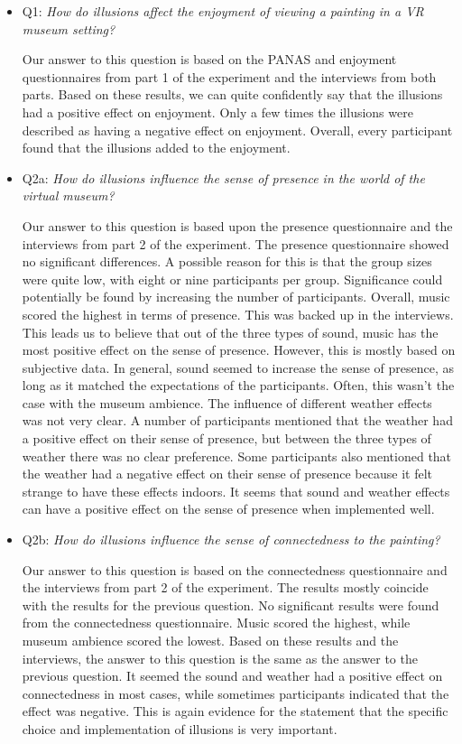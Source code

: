 \documentclass[a4paper]{article}
\begin{document}
\begin{itemize}
\item Q1: \emph{How do illusions affect the enjoyment of viewing a painting in a VR museum setting?}

Our answer to this question is based on the PANAS and enjoyment questionnaires from part 1 of the experiment and the interviews from both parts. Based on these results, we can quite confidently say that the illusions had a positive effect on enjoyment. Only a few times the illusions were described as having a negative effect on enjoyment. Overall, every participant found that the illusions added to the enjoyment.

\item Q2a: \emph{How do illusions influence the sense of presence in the world of the virtual museum?}

Our answer to this question is based upon the presence questionnaire and the interviews from part 2 of the experiment. The presence questionnaire showed no significant differences. A possible reason for this is that the group sizes were quite low, with eight or nine participants per group. Significance could potentially be found by increasing the number of participants. Overall, music scored the highest in terms of presence. This was backed up in the interviews. This leads us to believe that out of the three types of sound, music has the most positive effect on the sense of presence. However, this is mostly based on subjective data. In general, sound seemed to increase the sense of presence, as long as it matched the expectations of the participants. Often, this wasn't the case with the museum ambience. The influence of different weather effects was not very clear. A number of participants mentioned that the weather had a positive effect on their sense of presence, but between the three types of weather there was no clear preference. Some participants also mentioned that the weather had a negative effect on their sense of presence because it felt strange to have these effects indoors. It seems that sound and weather effects can have a positive effect on the sense of presence when implemented well.

\item Q2b: \emph{How do illusions influence the sense of connectedness to the painting?}

Our answer to this question is based on the connectedness questionnaire and the interviews from part 2 of the experiment. The results mostly coincide with the results for the previous question. No significant results were found from the connectedness questionnaire. Music scored the highest, while museum ambience scored the lowest. Based on these results and the interviews, the answer to this question is the same as the answer to the previous question. It seemed the sound and weather had a positive effect on connectedness in most cases, while sometimes participants indicated that the effect was negative. This is again evidence for the statement that the specific choice and implementation of illusions is very important.


\end{itemize}
\end{document}
